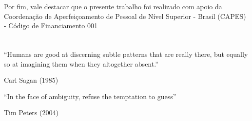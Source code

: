 Por fim, vale destacar que o presente trabalho foi realizado com apoio da Coordenação de Aperfeiçoamento de Pessoal de Nível Superior - Brasil (CAPES) - Código de Financiamento 001 


\newpage
\section*{}
\vspace{16cm}


 
\setlength{\epigraphrule}{0pt}
\epigraph{
``Humans are good at discerning subtle patterns that are really there, but equally so at imagining them when they altogether absent.''}{Carl Sagan (1985)}

\setlength{\epigraphrule}{0pt}
\epigraph{
``In the face of ambiguity, refuse the temptation to guess''}{Tim Peters (2004)}



